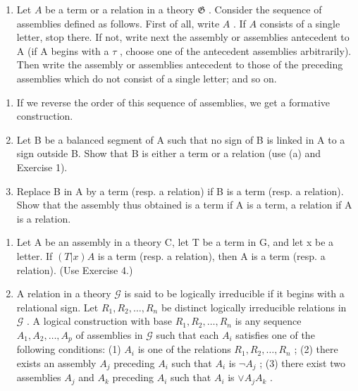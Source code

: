 \begin{enumerate}
\def\labelenumi{\arabic{enumi}.}
\setcounter{enumi}{3}
\tightlist
\item
  Let \(A\) be a term or a relation in a theory \(\mathfrak{G}\) . Consider the sequence of assemblies defined as follows. First of all, write \(A\) . If \(A\) consists of a single letter, stop there. If not, write next the assembly or assemblies antecedent to A (if A begins with a \(\tau\) , choose one of the antecedent assemblies arbitrarily). Then write the assembly or assemblies antecedent to those of the preceding assemblies which do not consist of a single letter; and so on.
\end{enumerate}

\begin{enumerate}
\def\labelenumi{(\alph{enumi})}
\item
  If we reverse the order of this sequence of assemblies, we get a formative construction.
\item
  Let B be a balanced segment of A such that no sign of B is linked in A to a sign outside B. Show that B is either a term or a relation (use (a) and Exercise 1).
\item
  Replace B in A by a term (resp. a relation) if B is a term (resp. a relation). Show that the assembly thus obtained is a term if A is a term, a relation if A is a relation.
\end{enumerate}

\begin{enumerate}
\def\labelenumi{\arabic{enumi}.}
\setcounter{enumi}{4}
\item
  Let A be an assembly in a theory C, let T be a term in G, and let x be a letter. If \((T|x)A\) is a term (resp. a relation), then A is a term (resp. a relation). (Use Exercise 4.)
\item
  A relation in a theory \(\mathcal{G}\) is said to be logically irreducible if it begins with a relational sign. Let \(R_{1}, R_{2}, \ldots, R_{n}\) be distinct logically irreducible relations in \(\mathcal{G}\) . A logical construction with base \(R_{1}, R_{2}, \ldots, R_{n}\) is any sequence \(A_{1}, A_{2}, \ldots, A_{p}\) of assemblies in \(\mathcal{G}\) such that each \(A_{i}\) satisfies one of the following conditions: (1) \(A_{i}\) is one of the relations \(R_{1}, R_{2}, \ldots, R_{n}\) ; (2) there exists an assembly \(A_{j}\) preceding \(A_{i}\) such that \(A_{i}\) is \(\neg A_{j}\) ; (3) there exist two assemblies \(A_{j}\) and \(A_{k}\) preceding \(A_{i}\) such that \(A_{i}\) is \(\vee A_{j}A_{k}\) .
\end{enumerate}

